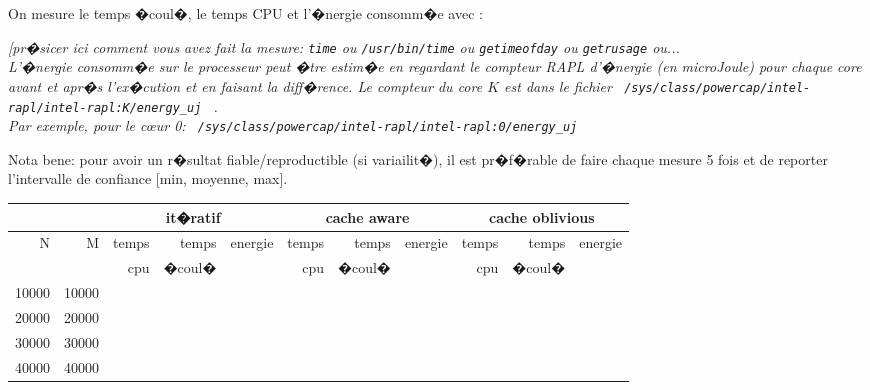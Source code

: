 \documentclass[10pt,a4paper]{article}
\begin{document}
On mesure le temps �coul�, le temps CPU et l'�nergie consomm�e avec : {\em  [pr�sicer ici comment vous avez fait la mesure:
{\tt time} 
ou {\tt /usr/bin/time}
ou {\tt getimeofday}
ou {\tt getrusage}
ou... \\
L'�nergie consomm�e sur le processeur peut �tre estim�e en regardant le compteur RAPL d'�nergie (en microJoule)
pour chaque core avant et apr�s l'ex�cution et en faisant la diff�rence.
Le compteur du core $K$ est dans le fichier 
\verb+ /sys/class/powercap/intel-rapl/intel-rapl:K/energy_uj + .\\
Par exemple, pour le c{\oe}ur 0: 
\verb+ /sys/class/powercap/intel-rapl/intel-rapl:0/energy_uj +

Nota bene: pour avoir un r�sultat fiable/reproductible (si variailit�), 
il est pr�f�rable de faire chaque mesure 5 fois et de reporter l'intervalle
de confiance [min, moyenne, max]. 

\begin{tabular}{|r|r||r|r|r||r|r|r||r|r|r||}
\hline
 \multicolumn{2}{|c||}{ } 
& \multicolumn{3}{c||}{it�ratif}
& \multicolumn{3}{c||}{cache aware}
& \multicolumn{3}{c||}{cache oblivious}
\\ \hline
N & M 
& temps   & temps & energie       %
& temps   & temps & energie       %
& temps   & temps & energie       %
\\
& 
& cpu     & �coul�&               %
& cpu     & �coul�&               %
& cpu     & �coul�&               %
\\ \hline
\hline
10000 & 10000 
&  &  &   %
&  &  &   %
&  &  &   %
\\ \hline
20000 & 20000 
&  &  &   %
&  &  &   %
&  &  &   %
\\ \hline
30000 & 30000 
&  &  &   %
&  &  &   %
&  &  &   %
\\ \hline
40000 & 40000 
&  &  &   %
&  &  &   %
&  &  &   %
\\ \hline
\hline
\end{tabular}
}
\end{document}
